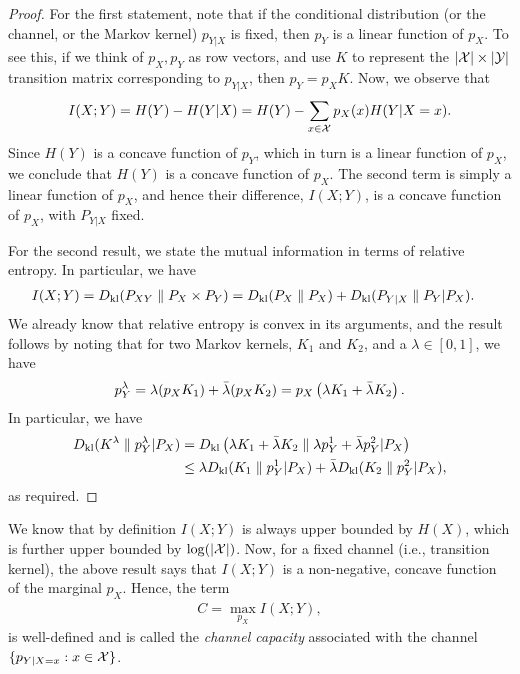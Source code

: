             \begin{proof}
                For the first statement, note that if the conditional distribution (or the channel, or the Markov kernel) $p_{Y|X}$ is fixed, then $p_Y$ is a linear function of $p_X$. To see this, if we think of $p_X, p_Y$ as row vectors, and use $K$ to represent the $|\mathcal{X}|\times |\mathcal{Y}|$ transition matrix corresponding to $p_{Y|X}$, then $p_Y = p_X K$. Now, we observe that 
                \begin{align}
                    I(X;Y) = H(Y) - H(Y|X) = H(Y) - \sum_{x \in \mathcal{X}} p_X(x) H(Y|X=x). 
                \end{align}
                Since $H(Y)$ is a concave function of $p_Y$, which in turn is a linear function of $p_X$, we conclude that $H(Y)$ is a concave function of $p_X$. The second term is simply a linear function of $p_X$, and hence their difference, $I(X;Y)$, is a concave function of $p_X$, with $P_{Y|X}$ fixed. 

                For the second result, we state the mutual information in terms of relative entropy. In particular,  we have 
                \begin{align}
                    I(X;Y) &= D_{\text{kl}}(P_{XY} \parallel P_X \times P_Y) = D_{\text{kl}} (P_X \parallel P_X) + D_{\text{kl}}( P_{Y|X} \parallel P_Y | P_X). 
                \end{align}
                We already know that relative entropy is convex in its arguments, and the result follows by noting that for two Markov kernels, $K_1$ and $K_2$, and a $\lambda \in [0,1]$, we have 
                \begin{align}
                    p_{Y}^{\lambda} = \lambda (p_X K_1) + \bar{\lambda}(p_X K_2) = p_X \left( \lambda K_1 + \bar{\lambda} K_2\right).     
                \end{align}
                In particular, we have 
                \begin{align}
                    D_{\text{kl}}(K^\lambda \parallel p_Y^\lambda|P_X) &= D_{\text{kl}} \left( \lambda K_1 + \bar{\lambda} K_2 \parallel \lambda p_Y^1 + \bar{\lambda}p_Y^2 | P_X\right) \\
                    & \leq \lambda D_{\text{kl}} (K_1 \parallel p_Y^1|P_X) + \bar{\lambda} D_{\text{kl}}(K_2 \parallel p_Y^2|P_X), 
                \end{align}
                as required. 
            \end{proof}

            \begin{remark}
                We know that by definition $I(X;Y)$ is always upper bounded by $H(X)$, which is further upper bounded by $\log(|\mathcal{X}|)$. Now, for a fixed channel (i.e., transition kernel), the above result says that $I(X;Y)$ is a non-negative, concave function of the marginal $p_X$. Hence, the term 
                \begin{align}
                    C = \max_{p_X} I(X; Y), 
                \end{align}
                is well-defined and is called the \emph{channel capacity} associated with the channel $\{p_{Y|X=x} : x \in \mathcal{X}\}$. 
            \end{remark}


